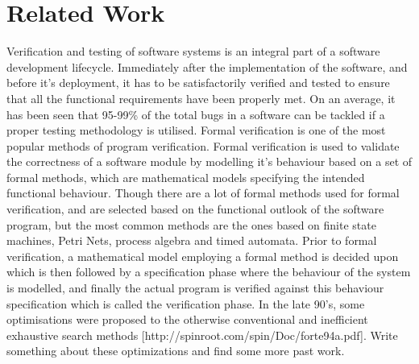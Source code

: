 

\section{Related Work}

Verification and testing of software systems is an integral part of a software development lifecycle. Immediately after the implementation of the software, and before it's deployment, it has to be satisfactorily verified and tested to ensure that all the functional requirements have been properly met. On an average, it has been seen that 95-99\% of the total bugs in a software can be tackled if a proper testing methodology is utilised. Formal verification is one of the most popular methods of program verification. Formal verification is used to validate the correctness of a software module by modelling it's behaviour based on a set of formal methods, which are mathematical models specifying the intended functional behaviour. Though there are a lot of formal methods used for formal verification, and are selected based on the functional outlook of the software program, but the most common methods are the ones based on finite state machines, Petri Nets, process algebra and timed automata. Prior to formal verification, a mathematical model employing a formal method is decided upon which is then followed by a specification phase where the behaviour of the system is modelled, and finally the actual program is verified against this behaviour specification which is called the verification phase. In the late 90's, some optimisations were proposed to the otherwise conventional and inefficient exhaustive search methods [http://spinroot.com/spin/Doc/forte94a.pdf]. Write something about these optimizations and find some more past work.\\

